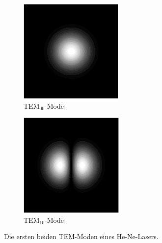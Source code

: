 \begin{figure}
  \centering
  \begin{subfigure}[c]{0.4\textwidth}
    \includegraphics[width=\textwidth]{Bilder/TEM00.png}
    \caption{TEM$_{00}$-Mode}
    \label{fig:TEM00}
  \end{subfigure}
  \begin{subfigure}[c]{0.4\textwidth}
    \includegraphics[width=\textwidth]{Bilder/TEM10.png}
    \caption{TEM$_{10}$-Mode}
    \label{fig:TEM10}
  \end{subfigure}
  \caption{Die ersten beiden TEM-Moden eines He-Ne-Lasers. \cite{TEM}}
\end{figure}

